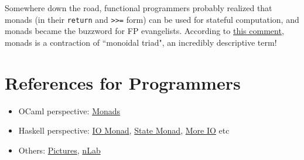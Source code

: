 \documentclass[11pt]{article}
\begin{document}
Somewhere down the road, functional programmers probably realized that monads (in their \texttt{return} and \texttt{>>=} form) can be used for stateful computation, and monads became the buzzword for FP evangelists. According to \href{https://english.stackexchange.com/questions/30654/where-does-the-term-monad-come-from#comment185062_30661}{this comment}, monads is a contraction of ``monoidal triad", an incredibly descriptive term!

\section{References for Programmers}
\begin{itemize}
\item OCaml perspective: \href{https://ocaml.org/docs/monads}{Monads}
\item Haskell perspective: \href{https://en.wikibooks.org/wiki/Haskell/Understanding_monads/IO}{IO Monad}, \href{https://en.wikibooks.org/wiki/Haskell/Understanding_monads/State}{State Monad}, \href{https://wiki.haskell.org/IO_inside}{More IO} etc
\item Others: \href{https://www.adit.io/posts/2013-04-17-functors,_applicatives,_and_monads_in_pictures.html#monads}{Pictures}, \href{https://ncatlab.org/nlab/show/monad+%28in+computer+science%29}{nLab}
\end{itemize}
\end{document}
